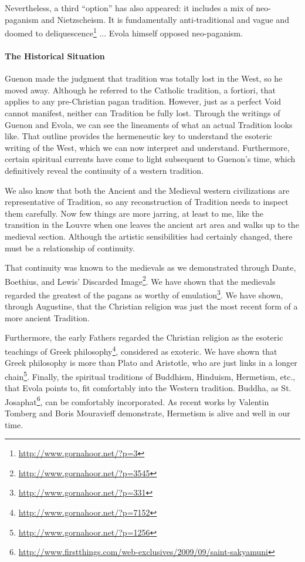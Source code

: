 Nevertheless, a third ``option'' has also appeared: it includes a mix of neo-paganism and Nietzscheism. It is fundamentally anti-traditional and vague and doomed to deliquescence\footnote{\url{http://www.gornahoor.net/?p=3}} ... Evola himself opposed neo-paganism.


\paragraph{The Historical Situation}


Guenon made the judgment that tradition was totally lost in the West, so he moved away. Although he referred to the Catholic tradition, a fortiori, that applies to any pre-Christian pagan tradition. However, just as a perfect Void cannot manifest, neither can Tradition be fully lost. Through the writings of Guenon and Evola, we can see the lineaments of what an actual Tradition looks like. That outline provides the hermeneutic key to understand the esoteric writing of the West, which we can now interpret and understand. Furthermore, certain spiritual currents have come to light subsequent to Guenon's time, which definitively reveal the continuity of a western tradition.

We also know that both the Ancient and the Medieval western civilizations are representative of Tradition, so any reconstruction of Tradition needs to inspect them carefully. Now few things are more jarring, at least to me, like the transition in the Louvre when one leaves the ancient art area and walks up to the medieval section. Although the artistic sensibilities had certainly changed, there must be a relationship of continuity.

That continuity was known to the medievals as we demonstrated through Dante, Boethius, and Lewis' Discarded Image\footnote{\url{http://www.gornahoor.net/?p=3545}}. We have shown that the medievals regarded the greatest of the pagans as worthy of emulation\footnote{\url{http://www.gornahoor.net/?p=331}}. We have shown, through Augustine, that the Christian religion was just the most recent form of a more ancient Tradition.

Furthermore, the early Fathers regarded the Christian religion as the esoteric teachings of Greek philosophy\footnote{\url{http://www.gornahoor.net/?p=7152}}, considered as exoteric. We have shown that Greek philosophy is more than Plato and Aristotle, who are just links in a longer chain\footnote{\url{http://www.gornahoor.net/?p=1256}}. Finally, the spiritual traditions of Buddhism, Hinduism, Hermetism, etc., that Evola points to, fit comfortably into the Western tradition. Buddha, as St. Josaphat\footnote{\url{http://www.firstthings.com/web-exclusives/2009/09/saint-sakyamuni}}, can be comfortably incorporated. As recent works by Valentin Tomberg and Boris Mouravieff demonstrate, Hermetism is alive and well in our time.

